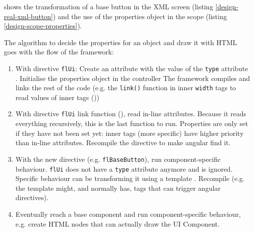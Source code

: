  shows the transformation of a base button in the \ac{XML} screen (listing \ref{design-real-xml-button}) and the use of the properties object in the scope (listing \ref{design-scope-properties}).

The algorithm to decide the properties for an object and draw it with \ac{HTML} goes with the flow of the framework:
\begin{enumerate}
	\item With directive \texttt{flUi}: Create an attribute with the value of the \texttt{type} attribute . Initialise the properties object in the controller  The framework compiles and links the rest of the code (e.g. the \texttt{link()} function in inner \texttt{width} tags to read values of inner tags ())
	\item With directive \texttt{flUi} link function (), read in-line attributes. Because it reads everything recursively, this is the last function to run. Properties are only set if they have not been set yet: inner tags (more specific) have higher priority than in-line attributes. Recompile the directive to make angular find it. 
	\item With the new directive (e.g. \texttt{flBaseButton}), run component-specific behaviour. \texttt{flUi} does not have a \texttt{type} attribute anymore and is ignored. Specific behaviour can be transforming it using a template . Recompile (e.g. the template might, and normally has, tags that can trigger angular directives).
	\item Eventually reach a base component and run component-specific behaviour, e.g. create \ac{HTML} nodes that can actually draw the UI Component.
\end{enumerate}

